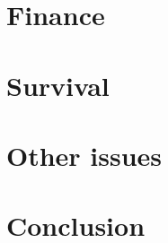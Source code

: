 \documentclass[a4paper]{proc}
\begin{document}
  \section{Finance}
  \label{sec:finance}



  \section{Survival}
  \label{sec:survival}


  \section{Other issues}
  \label{sec:other}


  \section{Conclusion}
  \label{sec:conclusion}

  \printbibliography
\end{document}
